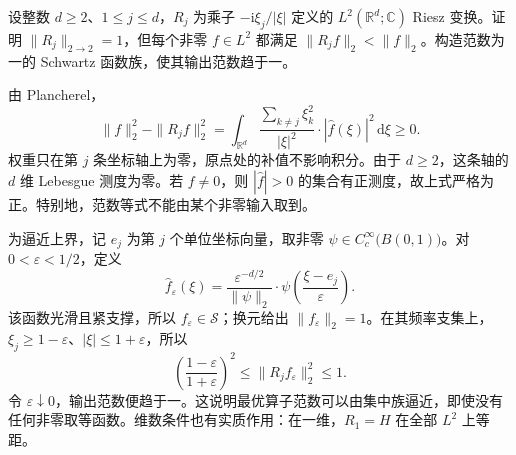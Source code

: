 \begin{exercise}\label{b2:ex:18-new-3}
设整数 \(d\geq2\)、\(1\leq j\leq d\)，\(R_j\) 为乘子
\(-\mathrm i\xi_j/|\xi|\) 定义的 \(L^2(\mathbb R^d;\mathbb C)\) Riesz 变换。证明
\(\|R_j\|_{2\to2}=1\)，但每个非零 \(f\in L^2\) 都满足
\(\|R_jf\|_2<\|f\|_2\)。构造范数为一的 Schwartz 函数族，使其输出范数趋于一。
\end{exercise}
\begin{solution}
由 Plancherel，
\[
 \|f\|_2^2-\|R_jf\|_2^2
 =\int_{\mathbb R^d}
   \frac{\sum_{k\ne j}\xi_k^2}{|\xi|^2}
       \cdot|\widehat f(\xi)|^2\,\mathrm d\xi\geq0.
\]
权重只在第 \(j\) 条坐标轴上为零，原点处的补值不影响积分。由于 \(d\geq2\)，这条轴的 \(d\) 维 Lebesgue 测度为零。若 \(f\ne0\)，则 \(|\widehat f|>0\) 的集合有正测度，故上式严格为正。特别地，范数等式不能由某个非零输入取到。

为逼近上界，记 \(e_j\) 为第 \(j\) 个单位坐标向量，取非零
\(\psi\in C_c^\infty\bigl(B(0,1)\bigr)\)。对 \(0<\varepsilon<1/2\)，定义
\[
 \widehat f_\varepsilon(\xi)
 =\frac{\varepsilon^{-d/2}}{\|\psi\|_2}
       \cdot\psi\left(\frac{\xi-e_j}{\varepsilon}\right).
\]
该函数光滑且紧支撑，所以 \(f_\varepsilon\in\mathcal S\)；换元给出
\(\|f_\varepsilon\|_2=1\)。在其频率支集上，\(\xi_j\geq1-\varepsilon\)、\(|\xi|\leq1+\varepsilon\)，所以
\[
 \left(\frac{1-\varepsilon}{1+\varepsilon}\right)^2
 \leq\|R_jf_\varepsilon\|_2^2\leq1.
\]
令 \(\varepsilon\downarrow0\)，输出范数便趋于一。这说明最优算子范数可以由集中族逼近，即使没有任何非零取等函数。维数条件也有实质作用：在一维，\(R_1=H\) 在全部 \(L^2\) 上等距。
\end{solution}

